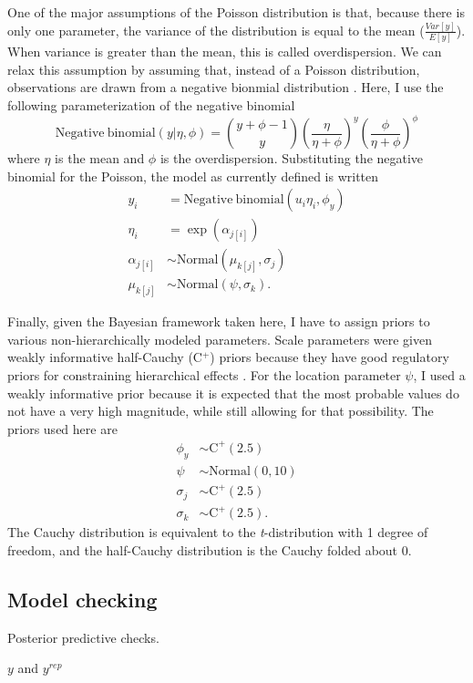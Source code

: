 \documentclass[12pt,letterpaper]{article}
\begin{document}
One of the major assumptions of the Poisson distribution is that, because there is only one parameter, the variance of the distribution is equal to the mean (\(\frac{Var[y]}{E[y]}\)). When variance is greater than the mean, this is called overdispersion. We can relax this assumption by assuming that, instead of a Poisson distribution, observations are drawn from a negative bionmial distribution \citep{Gelman2007}. Here, I use the following parameterization of the negative binomial 
\begin{equation}
  \mathrm{Negative\ binomial}(y | \eta, \phi) = {y + \phi -1 \choose y} \left(\frac{\eta}{\eta + \phi}\right)^{y} \left(\frac{\phi}{\eta + \phi}\right)^{\phi}
  \label{eq:neg_bin}
\end{equation}
where \(\eta\) is the mean and \(\phi\) is the overdispersion. Substituting the negative binomial for the Poisson, the model as currently defined is written
\begin{align}
  y_{i} &= \mathrm{Negative\ binomial}(u_{i}\eta_{i}, \phi_{y}) \nonumber \\
  \eta_{i} &= \exp(\alpha_{j[i]}) \nonumber \\
  \alpha_{j[i]} &\sim \mathrm{Normal}(\mu_{k[j]}, \sigma_{j}) \nonumber \\
  \mu_{k[j]} &\sim \mathrm{Normal}(\psi, \sigma_{k}).
  \label{eq:nb_mod}
\end{align}

Finally, given the Bayesian framework taken here, I have to assign priors to various non-hierarchically modeled parameters. Scale parameters were given weakly informative half-Cauchy (C\(^{+}\)) priors because they have good regulatory priors for constraining hierarchical effects \citep{Gelman2006,Gelman2013b}. For the location parameter \(\psi\), I used a weakly informative prior because it is expected that the most probable values do not have a very high magnitude, while still allowing for that possibility. The priors used here are
\begin{align*}
  \phi_{y} &\sim \mathrm{C}^{+}(2.5) \\
  \psi &\sim \mathrm{Normal}(0, 10) \\
  \sigma_{j} &\sim \mathrm{C}^{+}(2.5) \\
  \sigma_{k} &\sim \mathrm{C}^{+}(2.5).
\end{align*}
The Cauchy distribution is equivalent to the \textit{t}-distribution with 1 degree of freedom, and the half-Cauchy distribution is the Cauchy folded about 0.




\subsection{Model checking}
Posterior predictive checks.

\(y\) and \(y^{rep}\)
\end{document}
